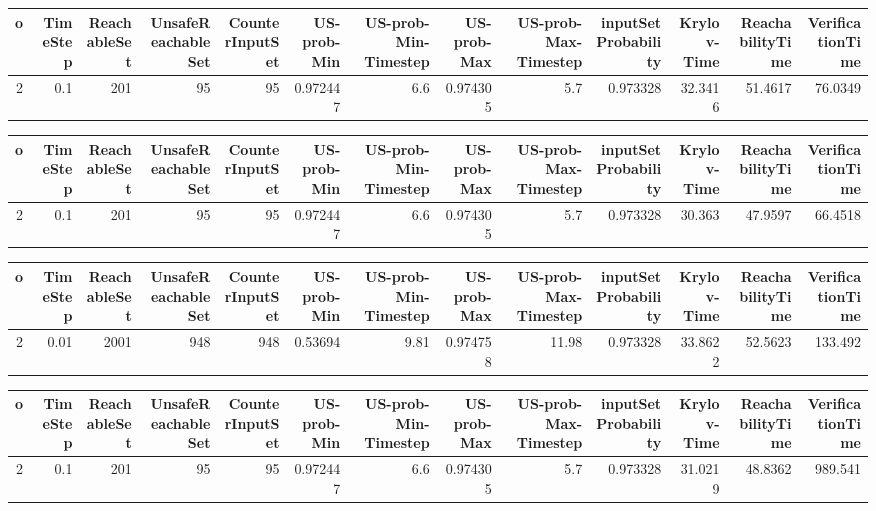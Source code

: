 \begin{tabular}{rrrrrrrrrrrrr}
\hline
   o &   TimeStep &   ReachableSet &   UnsafeReachableSet &   CounterInputSet &   US-prob-Min &   US-prob-Min-Timestep &   US-prob-Max &   US-prob-Max-Timestep &   inputSet Probability &   Krylov-Time &   ReachabilityTime &   VerificationTime \\
\hline
   2 &        0.1 &            201 &                   95 &                95 &      0.972447 &                    6.6 &      0.974305 &                    5.7 &               0.973328 &       32.3416 &            51.4617 &            76.0349 \\
\hline
\end{tabular}
\begin{tabular}{rrrrrrrrrrrrr}
\hline
   o &   TimeStep &   ReachableSet &   UnsafeReachableSet &   CounterInputSet &   US-prob-Min &   US-prob-Min-Timestep &   US-prob-Max &   US-prob-Max-Timestep &   inputSet Probability &   Krylov-Time &   ReachabilityTime &   VerificationTime \\
\hline
   2 &        0.1 &            201 &                   95 &                95 &      0.972447 &                    6.6 &      0.974305 &                    5.7 &               0.973328 &        30.363 &            47.9597 &            66.4518 \\
\hline
\end{tabular}
\begin{tabular}{rrrrrrrrrrrrr}
\hline
   o &   TimeStep &   ReachableSet &   UnsafeReachableSet &   CounterInputSet &   US-prob-Min &   US-prob-Min-Timestep &   US-prob-Max &   US-prob-Max-Timestep &   inputSet Probability &   Krylov-Time &   ReachabilityTime &   VerificationTime \\
\hline
   2 &       0.01 &           2001 &                  948 &               948 &       0.53694 &                   9.81 &      0.974758 &                  11.98 &               0.973328 &       33.8622 &            52.5623 &            133.492 \\
\hline
\end{tabular}
\begin{tabular}{rrrrrrrrrrrrr}
\hline
   o &   TimeStep &   ReachableSet &   UnsafeReachableSet &   CounterInputSet &   US-prob-Min &   US-prob-Min-Timestep &   US-prob-Max &   US-prob-Max-Timestep &   inputSet Probability &   Krylov-Time &   ReachabilityTime &   VerificationTime \\
\hline
   2 &        0.1 &            201 &                   95 &                95 &      0.972447 &                    6.6 &      0.974305 &                    5.7 &               0.973328 &       31.0219 &            48.8362 &            989.541 \\
\hline
\end{tabular}
